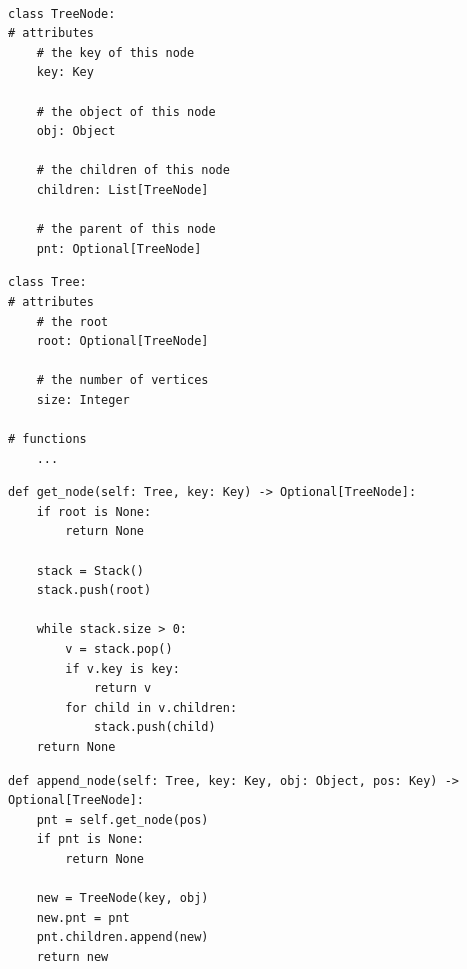 \documentclass[mathserif, handout]{beamer}
\begin{document}
\begin{frame}[fragile]
  \begin{thmboxtop}
     \\
    \begin{lstlisting}[style=mypython]
class TreeNode:
# attributes
    # the key of this node
    key: Key
    
    # the object of this node
    obj: Object

    # the children of this node 
    children: List[TreeNode]

    # the parent of this node
    pnt: Optional[TreeNode]
\end{lstlisting}
  \end{thmboxtop}
\end{frame}

\begin{frame}[fragile]
  \begin{thmboxbot}
    \begin{lstlisting}[style=mypython, firstnumber=last]
class Tree:
# attributes
    # the root
    root: Optional[TreeNode]

    # the number of vertices
    size: Integer

# functions
    ...
\end{lstlisting}
  \end{thmboxbot}
\end{frame}

\begin{frame}[fragile]
  \begin{proofbox}
    \begin{lstlisting}[style=mypython]
def get_node(self: Tree, key: Key) -> Optional[TreeNode]:
    if root is None:
        return None

    stack = Stack()
    stack.push(root)

    while stack.size > 0:
        v = stack.pop()
        if v.key is key:
            return v
        for child in v.children:
            stack.push(child)
    return None
\end{lstlisting}
  \end{proofbox}
\end{frame}

\begin{frame}[fragile]
  \begin{proofbox}
    \begin{lstlisting}[style=mypython]
def append_node(self: Tree, key: Key, obj: Object, pos: Key) -> Optional[TreeNode]:
    pnt = self.get_node(pos)
    if pnt is None:
        return None

    new = TreeNode(key, obj)
    new.pnt = pnt
    pnt.children.append(new)
    return new
\end{lstlisting}
  \end{proofbox}
\end{frame}
\end{document}
